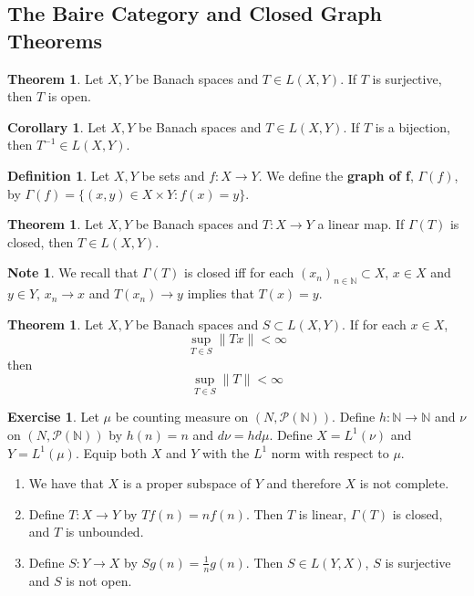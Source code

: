\documentclass[12pt]{amsart}
\theoremstyle{definition}
\newtheorem{defn}[definition]{Definition}
\newtheorem{note}[definition]{Note}
\newtheorem{thm}[definition]{Theorem}
\newtheorem{cor}[definition]{Corollary}
\newtheorem{ex}[definition]{Exercise}
\newcommand{\Gam}{\Gamma}
\newcommand{\N}{\mathbb{N}}
\newcommand{\MP}{\mathcal{P}}
\newcommand{\conv}[1]{\xrightarrow{#1}}
\newcommand{\lex}[1]{\label{ex:#1}}
\newcommand{\ld}[1]{\label{defn:#1}}
\begin{document}
	\newpage
	\subsection{The Baire Category and Closed Graph Theorems}
	
	\begin{thm}
		Let $X, Y$ be Banach spaces and $T\in L(X,Y)$. If $T$ is surjective, then $T$ is open.
	\end{thm}
	
	\begin{cor}
		Let $X, Y$ be Banach spaces and $T \in L(X,Y)$. If $T$ is a bijection, then $T^{-1} \in L(X,Y)$.
	\end{cor}
	
	\begin{defn} \ld{}
		Let $X,Y$ be sets and $f:X \rightarrow Y$. We define the \textbf{graph of f}, $\Gam(f)$, by $\Gam(f) = \{(x,y) \in X \times Y: f(x) = y\}$.
	\end{defn}
	
	\begin{thm}
		Let $X, Y$ be Banach spaces and $T:X \rightarrow Y$ a linear map. If $\Gam(T)$ is closed, then $T \in L(X,Y)$.  
	\end{thm}
	
	\begin{note}
		We recall that $\Gam(T)$ is closed iff for each $(x_n)_{n \in \N} \subset X$, $x \in X$ and $y \in Y$, $x_n \conv{} x$ and $T(x_n) \conv{} y$ implies that $T(x) = y$. 
	\end{note}
	
	\begin{thm}
		
		Let $X, Y$ be Banach spaces and $S \subset L(X,Y)$. If for each $x \in X$, $$\sup_{T \in S} \|Tx \|< \infty$$ then $$\sup_{T \in S} \|T \|< \infty$$
	\end{thm}
	
	\begin{ex} \lex{}
		Let $\mu$ be counting measure on $(N, \MP(\N))$. Define $h: \N \rightarrow \N$ and $ \nu$ on $(N, \MP(\N))$ by $h(n) = n$ and $d \nu = h d \mu$. Define $X=L^1(\nu)$ and $Y = L^1(\mu)$. Equip both $X$ and $Y$ with the $L^1$ norm with respect to $\mu$. 
		\begin{enumerate}
			\item We have that $X$ is a proper subspace of $Y$ and therefore $X$ is not complete.
			\item Define $T: X \rightarrow Y$ by $Tf(n) = nf(n)$. Then $T$ is linear, $\Gam(T)$ is closed, and $T$ is unbounded.
			\item Define $S:Y \rightarrow X$ by $Sg(n) = \frac{1}{n}g(n)$. Then $S \in L(Y,X)$, $S$ is surjective and $S$ is not open. 
		\end{enumerate}
	\end{ex}
	
\end{document}
